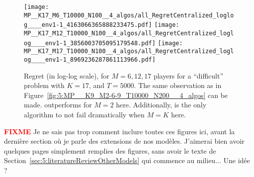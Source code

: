 \begin{figure}[!h]
  \centering
      \texttt{[image: MP\_\_K17\_M6\_T10000\_N100\_\_4\_algos/all\_RegretCentralized\_loglog\_\_\_\_env1-1\_4163066365888233475.pdf]}
      \texttt{[image: MP\_\_K17\_M12\_T10000\_N100\_\_4\_algos/all\_RegretCentralized\_loglog\_\_\_\_env1-1\_3856003705095179548.pdf]}
      \texttt{[image: MP\_\_K17\_M17\_T10000\_N100\_\_4\_algos/all\_RegretCentralized\_loglog\_\_\_\_env1-1\_8969236287861113966.pdf]}
  \caption[Regret for $M=6, 12, 17$ players for a ``difficult'' problem with $K=17$, and $T=5000$]{Regret (in log-log scale), for $M=6, 12, 17$ players for a ``difficult'' problem with $K=17$, and $T=5000$. The same observation as in Figure~\ref{fig:5:MP__K9_M2-6-9_T10000_N200__4_algos} can be made. \Selfish{} outperforms \MCTopM{} for $M=2$ here. Additionally, \MCTopM{} is the only algorithm to not fail dramatically when $M=K$ here.}
  \label{fig:5:MP__K17_M6-12-17_T10000_N100__4_algos}
\end{figure}


\begin{framed}
  \textcolor{red}{\textbf{FIXME}}
  Je ne sais pas trop comment inclure toutes ces figures ici, avant la dernière section où je parle des extensions de nos modèles.
  J'aimerai bien avoir quelques pages simplement remplies des figures, sans avoir le texte de Section~\ref{sec:5:literatureReviewOtherModels} qui commence au milieu...
  Une idée ?
\end{framed}
